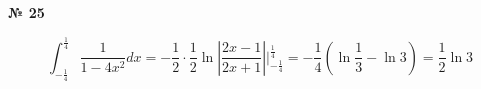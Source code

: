\documentclass{article}
\begin{document}
\textbf{№ 25} 

$$ \int_{-\frac{1}{4}}^{\frac{1}{4}} \frac{1}{1-4x^2} dx 
= -\frac{1}{2} \cdot \frac{1}{2} \ln{\left| \frac{2x-1}{2x+1} \right|} \bigg\vert_{-\frac{1}{4}}^{\frac{1}{4}}
= - \frac{1}{4} \left( \ln{\frac{1}{3}} - \ln{3} \right)
= \frac{1}{2} \ln{3} $$
\end{document}

